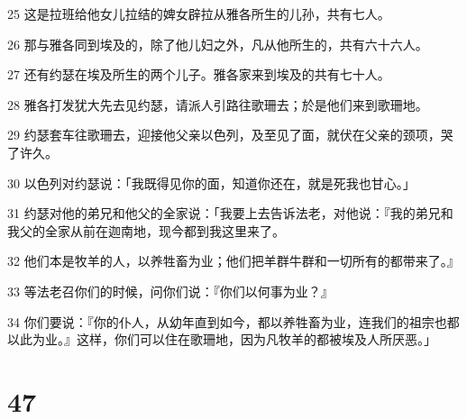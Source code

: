 \par 25 这是拉班给他女儿拉结的婢女辟拉从雅各所生的儿孙，共有七人。
\par 26 那与雅各同到埃及的，除了他儿妇之外，凡从他所生的，共有六十六人。
\par 27 还有约瑟在埃及所生的两个儿子。雅各家来到埃及的共有七十人。
\par 28 雅各打发犹大先去见约瑟，请派人引路往歌珊去；於是他们来到歌珊地。
\par 29 约瑟套车往歌珊去，迎接他父亲以色列，及至见了面，就伏在父亲的颈项，哭了许久。
\par 30 以色列对约瑟说：「我既得见你的面，知道你还在，就是死我也甘心。」
\par 31 约瑟对他的弟兄和他父的全家说：「我要上去告诉法老，对他说：『我的弟兄和我父的全家从前在迦南地，现今都到我这里来了。
\par 32 他们本是牧羊的人，以养牲畜为业；他们把羊群牛群和一切所有的都带来了。』
\par 33 等法老召你们的时候，问你们说：『你们以何事为业？』
\par 34 你们要说：『你的仆人，从幼年直到如今，都以养牲畜为业，连我们的祖宗也都以此为业。』这样，你们可以住在歌珊地，因为凡牧羊的都被埃及人所厌恶。」

\chapter{47}

